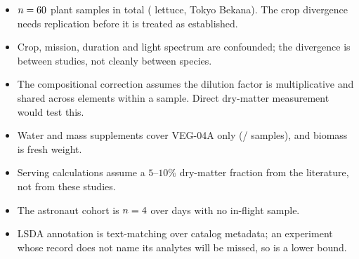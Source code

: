 \begin{itemize}\itemsep2pt
  \item $n=60$ plant samples in total (\NLet{} lettuce, \NTb{} Tokyo
        Bekana). The crop divergence needs replication before it is treated as
        established.
  \item Crop, mission, duration and light spectrum are confounded; the
        divergence is between studies, not cleanly between species.
  \item The compositional correction assumes the dilution factor is
        multiplicative and shared across elements within a sample. Direct
        dry-matter measurement would test this.
  \item Water and mass supplements cover VEG-04A only
        (\SupplyMatched/\SupplyTotal{} samples), and biomass is fresh weight.
  \item Serving calculations assume a $5$--$10\%$ dry-matter fraction from the
        literature, not from these studies.
  \item The astronaut cohort is $n=4$ over \AstroDuration{} days with no
        in-flight sample.
  \item LSDA annotation is text-matching over catalog metadata; an experiment
        whose record does not name its analytes will be missed, so
        \LSDAMeasured{} is a lower bound.
\end{itemize}
